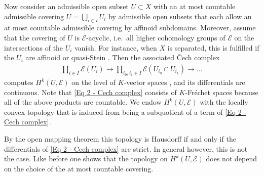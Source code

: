 \documentclass[a4paper, reqno, 10pt]{amsart}
\theoremstyle{definition}
\numberwithin{equation}{section}
\newcommand{\lra}{\longrightarrow}
\newcommand{\ra}{\rightarrow}
\newcommand{\CE}{{\mathcal {E}}}
\begin{document}
Now consider an admissible open subset $U\subset X$ with an at most countable admissible covering $U = \bigcup_{i \in I} U_i$ by admissible open subsets that each allow an at most countable admissible covering by affinoid subdomains.
Moreover, assume that the covering of $U$ is $\CE$-acyclic, i.e.\ all higher cohomology groups of $\CE$ on the intersections of the $U_i$ vanish.
For instance, when $X$ is separated, this is fulfilled if the $U_i$ are affinoid or quasi-Stein \cite[1.6]{vanderPut92SerreDualRigidAnSp}.
Then the associated \v{C}ech complex
\begin{align}\label{Eq 2 - Cech complex}
	\prod_{i\in I} \CE(U_i) \lra \prod_{i_0,i_1 \in I} \CE(U_{i_0}\cap U_{i_1}) \lra \ldots
\end{align}
computes $H^k(U,\CE)$ on the level of $K$-vector spaces \cite[6.2 Thm.\ 5]{Bosch14LectFormRigidGeom}, and its differentials are continuous.
Note that \eqref{Eq 2 - Cech complex} consists of $K$-Fr\'echet spaces because all of the above products are countable.
We endow $H^k(U,\CE)$ with the locally convex topology that is induced from being a subquotient of a term of \eqref{Eq 2 - Cech complex}.


By the open mapping theorem \cite[Prop.\ 8.6]{Schneider02NonArchFunctAna} this topology is Hausdorff if and only if the differentials of \eqref{Eq 2 - Cech complex} are strict.
In general however, this is not the case.
Like before one shows that the topology on $H^k(U,\CE)$ does not depend on the choice of the at most countable covering.
\end{document}
